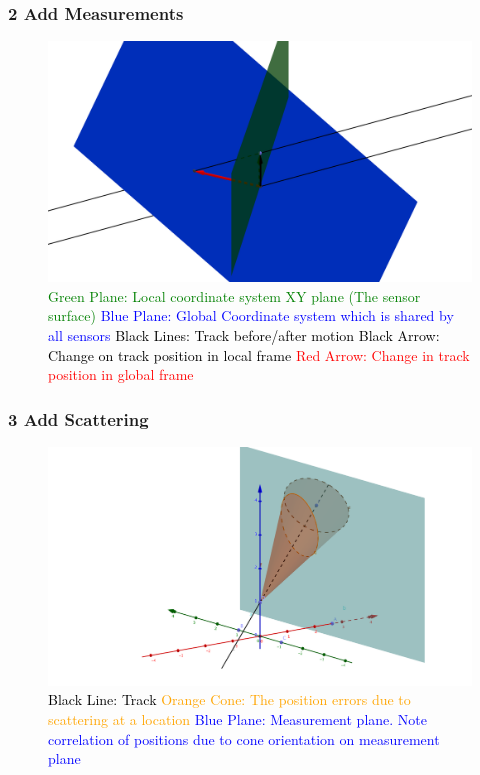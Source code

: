 \documentclass{beamer}
\begin{document}
\begin{frame}
\frametitle{\textbf{2} Add Measurements}
\begin{figure}
\label{Meas}
\includegraphics[width=0.6\linewidth]{pics/prop.png}
\caption{
\textcolor{green}{Green Plane: Local coordinate system XY plane (The sensor surface)}\newline
\textcolor{blue}{Blue Plane: Global Coordinate system which is shared by all sensors}\newline
\textcolor{black}{Black Lines: Track before/after motion}\newline
\textcolor{black}{Black Arrow: Change on track position in local frame}\newline
\textcolor{red}{Red Arrow: Change in track position in global frame}\newline}
\end{figure}
\end{frame}

\begin{frame}
\frametitle{\textbf{3} Add Scattering}
\begin{figure}
\includegraphics[width=0.7\linewidth]{pics/prop600GoodOffSensor.png}
\caption{
\textcolor{black}{Black Line: Track} \newline
\textcolor{orange}{Orange Cone: The position errors due to scattering at a location} \newline
\textcolor{blue}{Blue Plane: Measurement plane. Note correlation of positions due to cone orientation on measurement plane} \newline
}
\label{fig:ScatFrame}
\end{figure}
\end{frame}
\end{document}
